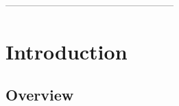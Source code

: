 \documentclass[
10pt, %
a4paper, %
oneside, %
headinclude,footinclude, %
BCOR5mm, %
]{scrartcl}
\title{\normalfont\spacedallcaps{Project Plan}} %
\author{\spacedlowsmallcaps{CS -01 D-Enigma}} %
\date{} %
\begin{document}

-----------------------------------------------------

\maketitle %

\setcounter{tocdepth}{2} %

\tableofcontents %






\let\thefootnote\relax{}



\newpage %


\section{Introduction}

\subsection{\textbf{ Overview}}
\end{document}
